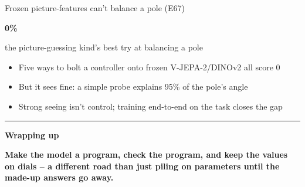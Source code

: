 \documentclass[aspectratio=169,11pt]{beamer}
\begin{document}
\begin{frame}{Frozen picture-features can't balance a pole (E67)}\vfill\begin{center}{\color{owteal}\fontsize{58}{62}\selectfont\bfseries 0\%}\par\vskip10pt{\color{owdeep}\large the picture-guessing kind's best try at balancing a pole}\end{center}\vskip10pt\begin{itemize}\item Five ways to bolt a controller onto frozen V-JEPA-2/DINOv2 all score 0\item But it sees fine: a simple probe explains 95\% of the pole's angle\item Strong seeing isn't control; training end-to-end on the task closes the gap\end{itemize}\vfill\end{frame}
\begin{frame}[plain]\centering\vfill
{\color{owochre}\rule{40pt}{2.5pt}}\par\vskip10pt
{\color{owdeep}\bfseries\Large Wrapping up\par}\vfill\end{frame}
\begin{frame}[plain]\centering\vfill
{\color{owdeep}\bfseries\LARGE Make the model a program, check the program, and keep the values on dials -- a different road than just piling on parameters until the made-up answers go away.\par}\vfill\end{frame}
\end{document}
